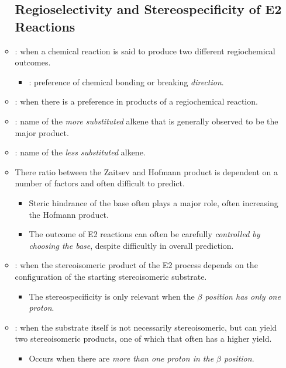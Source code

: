 \begin{itemize}
\begin{itemize}
      \subsection{Regioselectivity and Stereospecificity of E2 Reactions}
        \item {}: when a chemical reaction is said to produce two different regiochemical outcomes.
            \begin{itemize}
                \item {}: preference of chemical bonding or breaking \emph{direction}. 
            \end{itemize}
        \item {}: when there is a preference in products of a regiochemical reaction.
        \item {}: name of the \emph{more substituted} alkene that is generally observed to be the major product.
        \item {}: name of the \emph{less substituted} alkene.
        \item There ratio between the Zaitsev and Hofmann product is dependent on a number of factors and often difficult to predict.
            \begin{itemize}
                \item Steric hindrance of the base often plays a major role, often increasing the Hofmann product.
                \item The outcome of E2 reactions can often be carefully \emph{ controlled by choosing the base}, despite difficultly in overall prediction.
            \end{itemize}
        \item {}: when the stereoisomeric product of the E2 process depends on the configuration of the starting stereoisomeric substrate.
            \begin{itemize}
                \item The stereospecificity is only relevant when the \emph{\(\beta \) position has only one proton}.
            \end{itemize}
        \item {}: when the substrate itself is not necessarily stereoisomeric, but can yield two stereoisomeric products, one of which that often has a higher yield.
            \begin{itemize}
                \item Occurs when there are \emph{more than one proton in the \(\beta \) position}.

\end{itemize}
\end{itemize}
\end{itemize}
